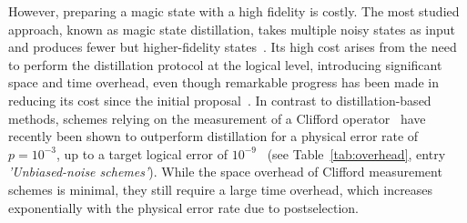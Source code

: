 \documentclass[%
 reprint,
superscriptaddress,
 amsmath,amssymb,
 aps,
]{revtex4-2}
\begin{document}
\begin{table}
\label{tab:overhead}
\end{table}

However, preparing a magic state with a high fidelity is costly. The most studied approach, known as magic state distillation, takes multiple noisy states as input and produces fewer but higher-fidelity states~\cite{bravyi2005universal}. Its high cost arises from the need to perform the distillation protocol at the logical level, introducing significant space and time overhead, even though remarkable progress has been made in reducing its cost since the initial proposal~\cite{litinski2019magic,gidney2019efficient}. In contrast to distillation-based methods, schemes relying on the measurement of a Clifford operator~\cite{shor1996fault,gottesman1999demonstrating,zhou2000methodology} have recently been shown to outperform distillation for a physical error rate of $p=10^{-3}$, up to a target logical error of $10^{-9}$~\cite{gidney2024magic} (see Table~\ref{tab:overhead}, entry \textit{'Unbiased-noise schemes'}). While the space overhead of Clifford measurement schemes is minimal, they still require a large time overhead, which increases exponentially with the physical error rate due to postselection.
\end{document}
